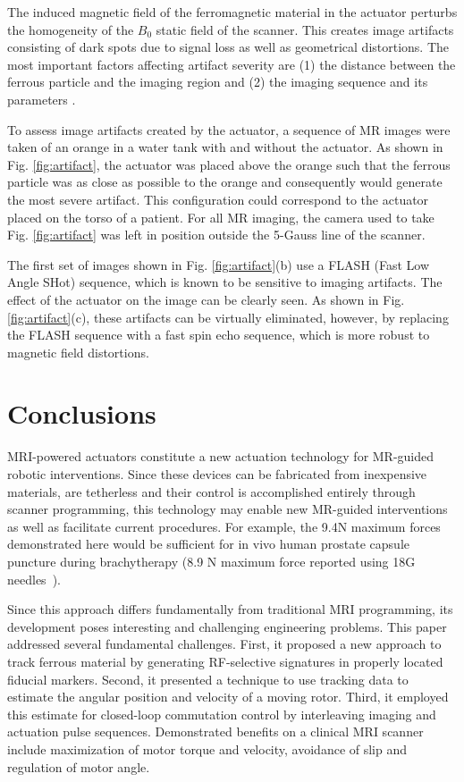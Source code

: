 \documentclass[journal]{IEEEtran}
\begin{document}
The induced magnetic field of the ferromagnetic material in the actuator perturbs the homogeneity of the $B_0$ static field of the scanner. This  creates image artifacts consisting of dark spots due to signal loss as well as geometrical distortions. The most important factors affecting artifact severity are (1) the distance between the ferrous particle and the imaging region and (2) the imaging sequence and its parameters \cite{Posse1990Susceptibility}. 

To assess image artifacts created by the actuator, a sequence of MR images were taken of an orange in a water tank with and without the actuator. As shown in Fig. \ref{fig:artifact}, the actuator was placed above the orange such that the ferrous particle was as close as possible to the orange and consequently would generate the most severe artifact. This configuration could correspond to the actuator placed on the torso of a patient. For all MR imaging, the camera used to take Fig. \ref{fig:artifact} was left in position outside the 5-Gauss line of the scanner. 

The first set of images shown in Fig. \ref{fig:artifact}(b) use a FLASH (Fast Low Angle SHot) sequence, which is known to be sensitive to imaging artifacts. The effect of the actuator on the image can be clearly seen. As shown in Fig. \ref{fig:artifact}(c), these artifacts can be virtually eliminated, however, by replacing the FLASH sequence with a fast spin echo sequence, which is more robust to magnetic field distortions. 

\section{Conclusions}
\label{sec:conclusions}

MRI-powered actuators constitute a new actuation technology for MR-guided robotic interventions. Since these devices can be fabricated from inexpensive materials, are tetherless and their control is accomplished entirely through scanner programming, this technology may enable new MR-guided interventions as well as facilitate current procedures. For example, the 9.4N maximum forces demonstrated here would be sufficient for in vivo human prostate capsule puncture during brachytherapy (8.9 N maximum force reported using 18G needles~\cite{podder2006vivo}).

Since this approach differs fundamentally from traditional MRI programming, its development poses interesting and challenging engineering problems. This paper addressed several fundamental challenges. First, it  proposed a new approach to track ferrous material by generating RF-selective signatures in properly located fiducial markers. Second,  it presented a technique to use tracking data to estimate the angular position and velocity of a moving rotor.  Third, it employed this estimate for closed-loop commutation control by interleaving imaging and actuation pulse sequences. Demonstrated benefits on a clinical MRI scanner include maximization of motor torque and velocity, avoidance of slip and regulation of motor angle.
\end{document}
